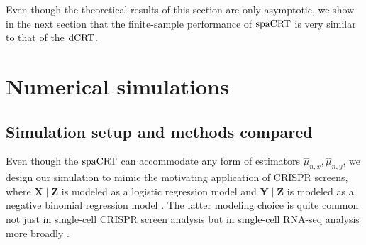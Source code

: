 \documentclass[12pt]{article}
\theoremstyle{definition}
\newcommand{\prx}{\bm X}								%
\newcommand{\prz}{\bm Z}								%
\newcommand{\pry}{{\bm Y}}								%
\newcommand{\dCRT}{\textnormal{dCRT}} 					%
\newcommand{\spacrt}{\textnormal{spaCRT}}               %
\begin{document}
Even though the theoretical results of this section are only asymptotic, we show in the next section that the finite-sample performance of $\spacrt$ is very similar to that of the $\dCRT$.

\section{Numerical simulations}\label{sec:simulation}


\subsection{Simulation setup and methods compared} \label{sec:simulation-setup}
{\color{red}
Even though the $\spacrt$ can accommodate any form of estimators $\widehat{\mu}_{n,x},\widehat{\mu}_{n,y}$, we design our simulation to mimic the motivating application of CRISPR screens, where $\prx\mid\prz$ is modeled as a logistic regression model and $\pry\mid\prz$ is modeled as a negative binomial regression model \citep{Barry2024,Katsevich2020c,Gasperini2019a}. The latter modeling choice is quite common not just in single-cell CRISPR screen analysis but in single-cell RNA-seq analysis more broadly \citep{Huang2018, Townes2019, Svensson2020}.  
}
\end{document}
